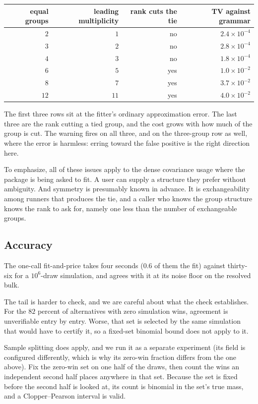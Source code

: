 \documentclass[11pt]{article}
\begin{document}
\begin{center}\small
\begin{tabular}{rrrr}
\toprule
equal groups & leading multiplicity & rank cuts the tie & TV against grammar\\
\midrule
$2$ & $1$ & no & $2.4\times10^{-4}$\\
$3$ & $2$ & no & $2.8\times10^{-4}$\\
$4$ & $3$ & no & $1.8\times10^{-4}$\\
$6$ & $5$ & yes & $1.0\times10^{-2}$\\
$8$ & $7$ & yes & $3.7\times10^{-2}$\\
$12$ & $11$ & yes & $4.0\times10^{-2}$\\
\bottomrule
\end{tabular}
\end{center}

The first three rows sit at the fitter's ordinary approximation error.
The last three are the rank cutting a tied group, and the cost grows with
how much of the group is cut. The warning fires on all three, and on the
three-group row as well, where the error is harmless: erring toward the
false positive is the right direction here.

To emphasize, all of these issues apply to the dense covariance usage where the package is being asked to fit. A
user can supply a structure they prefer without ambiguity. And symmetry is
presumably known in advance. It is exchangeability among runners that produces the tie, and a
caller who knows the group structure knows the rank to ask for, namely
one less than the number of exchangeable groups.

\subsection{Accuracy}
The one-call fit-and-price takes four
seconds ($0.6$ of them the fit) against thirty-six for a $10^6$-draw
simulation, and agrees with it at its noise floor on the resolved bulk.

The tail is harder to check, and we are careful about what the check
establishes. For the $82$ percent of alternatives with zero simulation
wins, agreement is unverifiable entry by entry. Worse, that set is
selected by the same simulation that would have to certify it, so a
fixed-set binomial bound does not apply to it.

Sample splitting does apply, and we run it as a separate experiment
(its field is configured differently, which is why its zero-win fraction
differs from the one above). Fix the zero-win set on one
half of the draws, then count the wins an independent second half places
anywhere in that set. Because the set is fixed before the second half is
looked at, its count is binomial in the set's true mass, and a
Clopper--Pearson interval is valid.
\end{document}
